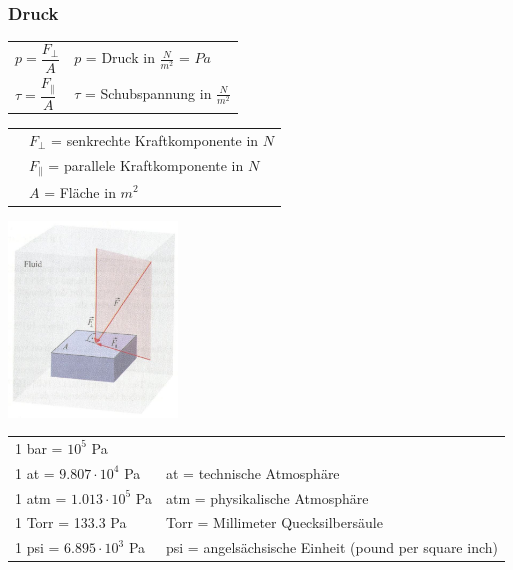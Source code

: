 	\subsubsection{Druck}
		\begin{minipage}[t]{13cm}
				\renewcommand{\arraystretch}{2.5}
				\begin{tabular}{ p{4cm} p{7cm}}
					$p = \dfrac{F_{\perp}}{A}$	&	$p$ = Druck in $\frac{N}{m^2}$ = $Pa$\\
					$\tau = \dfrac{F_{\parallel}}{A} $	& $\tau$ = Schubspannung in $\frac{N}{m^2}$\\
				\end{tabular}
				\renewcommand{\arraystretch}{1.5}
				\begin{tabular}{ p{4cm} p{7cm} }
					& $F_{\perp}$ = senkrechte Kraftkomponente in $N$\\
					& $F_{\parallel}$ = parallele Kraftkomponente in $N$\\
					& $A$ = Fläche in $m^2$\\
				\end{tabular} 
				\renewcommand{\arraystretch}{1}
		\end{minipage}
		\begin{minipage}[t]{5cm}
			\vspace{-\ht\strutbox}\includegraphics[width=4.5cm]{./bilder/Druck.jpg}
		\end{minipage}
		\newline
		\newline
		\begin{minipage}[t]{12cm}
				\renewcommand{\arraystretch}{1.5}
				\begin{tabular}{ p{4cm} p{9cm}}
					1 bar = $10^5$ Pa\\
					1 at = $9.807 \cdot 10^4$ Pa	&	at = technische Atmosphäre\\
					1 atm = $1.013 \cdot 10^5$ Pa	&	atm = physikalische Atmosphäre\\
					1 Torr = 133.3 Pa	&	Torr = Millimeter Quecksilbersäule\\
					1 psi = $6.895 \cdot 10^3$ Pa	&	psi = angelsächsische Einheit (pound per square inch)\\
				\end{tabular}
				\renewcommand{\arraystretch}{1}
		\end{minipage}
